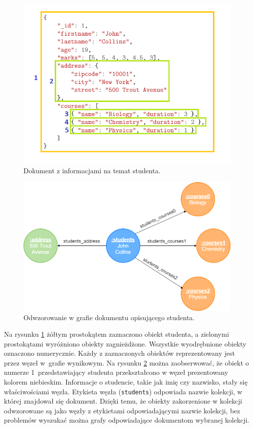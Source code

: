 \documentclass[a4paper,twoside,12pt]{book}
\begin{document}
\begin{figure}
\centering
\includegraphics[width=12cm]{images/JSON-student.png}
\caption{Dokument z informacjami na temat studenta.}
\label{fig:dokument-student}
\end{figure}

\begin{figure}
\centering
\includegraphics[width=12cm]{images/graf_student.png}
\caption{Odwzorowanie w grafie dokumentu opisującego studenta.}
\label{fig:graf-student}
\end{figure}

Na rysunku \ref{fig:dokument-student} żółtym prostokątem zaznaczono obiekt studenta, a zielonymi prostokątami wyróżniono obiekty zagnieżdżone. Wszystkie wyodrębnione obiekty oznaczono numerycznie. Każdy z zaznaczonych obiektów reprezentowany jest przez węzeł w~grafie wynikowym. Na rysunku \ref{fig:graf-student} można zaobserwować, że obiekt o numerze 1~przedstawiający studenta przekształcono w węzeł prezentowany kolorem niebieskim. Informacje o studencie, takie jak imię czy nazwisko, stały się właściwościami węzła. Etykieta węzła (\lstinline{students}) odpowiada nazwie kolekcji, w której znajdował się dokument. Dzięki temu, że obiekty zakorzenione w kolekcji odwzorowane są jako węzły z etykietami odpowiadającymi nazwie kolekcji, bez problemów wyszukać można grafy odpowiadające dokumentom wybranej kolekcji. 
\end{document}
